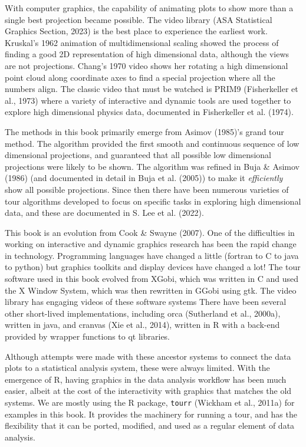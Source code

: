 \documentclass[
  letterpaper,
]{krantz}
\begin{document}
With computer graphics, the capability of animating plots to show more
than a single best projection became possible. The video library (ASA
Statistical Graphics Section, 2023) is the best place to experience the
earliest work. Kruskal's 1962 animation of multidimensional scaling
showed the process of finding a good 2D representation of high
dimensional data, although the views are not projections. Chang's 1970
video shows her rotating a high dimensional point cloud along coordinate
axes to find a special projection where all the numbers align. The
classic video that must be watched is PRIM9 (Fisherkeller et al., 1973)
where a variety of interactive and dynamic tools are used together to
explore high dimensional physics data, documented in Fisherkeller et al.
(1974).

The methods in this book primarily emerge from Asimov (1985)'s grand
tour method. The algorithm provided the first smooth and continuous
sequence of low dimensional projections, and guaranteed that all
possible low dimensional projections were likely to be shown. The
algorithm was refined in Buja \& Asimov (1986) (and documented in detail
in Buja et al. (2005)) to make it \emph{efficiently} show all possible
projections. Since then there have been numerous varieties of tour
algorithms developed to focus on specific tasks in exploring high
dimensional data, and these are documented in S. Lee et al. (2022).

This book is an evolution from Cook \& Swayne (2007). One of the
difficulties in working on interactive and dynamic graphics research has
been the rapid change in technology. Programming languages have changed
a little (fortran to C to java to python) but graphics toolkits and
display devices have changed a lot! The tour software used in this book
evolved from XGobi, which was written in C and used the X Window System,
which was then rewritten in GGobi using gtk. The video library has
engaging videos of these software systems There have been several other
short-lived implementations, including orca (Sutherland et al., 2000a),
written in java, and cranvas (Xie et al., 2014), written in R with a
back-end provided by wrapper functions to qt libraries.

Although attempts were made with these ancestor systems to connect the
data plots to a statistical analysis system, these were always limited.
With the emergence of R, having graphics in the data analysis workflow
has been much easier, albeit at the cost of the interactivity with
graphics that matches the old systems. We are mostly using the R
package, \texttt{tourr} (Wickham et al., 2011a) for examples in this
book. It provides the machinery for running a tour, and has the
flexibility that it can be ported, modified, and used as a regular
element of data analysis.
\end{document}
